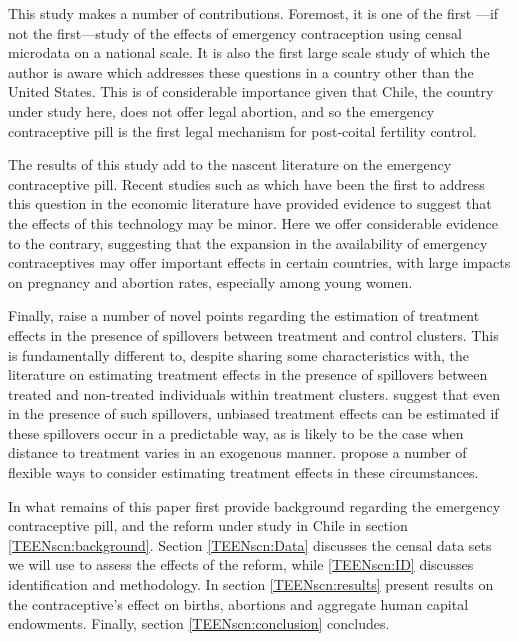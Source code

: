 This study makes a number of contributions.  Foremost, it is one of the first%
---if not the first---study of the effects of emergency contraception using 
censal microdata on a national scale.  It is also the first large scale study 
of which the author is aware which addresses these questions in a country other 
than the United States.  This is of considerable importance given that Chile, 
the country under study here, does not offer legal abortion, and so the 
emergency contraceptive pill is the first legal mechanism for post-coital 
fertility control.

The results of this study add to the nascent literature on the emergency 
contraceptive pill.  Recent studies such as \citet{Grossetal2012, Durrance2013} 
which have been the first to address this question in the economic literature
have provided evidence to suggest that the effects of this technology may be 
minor.  Here we offer considerable evidence to the contrary, suggesting
that the expansion in the availability of emergency contraceptives may offer 
important effects in certain countries, with large impacts on pregnancy and 
abortion rates, especially among young women.

Finally, \person raise a number of novel points regarding the estimation of 
treatment effects in the presence of spillovers between treatment and control
clusters.  This is fundamentally different to, despite sharing some 
characteristics with, the literature on estimating treatment effects in the 
presence of spillovers between treated and non-treated individuals within 
treatment clusters.  \Person suggest that even in the presence of such 
spillovers, unbiased treatment effects can be estimated if these spillovers
occur in a predictable way, as is likely to be the case when distance to 
treatment varies in an exogenous manner. \Person propose a number of flexible
ways to consider estimating treatment effects in these circumstances.

In what remains of this paper \person first provide background regarding the
emergency contraceptive pill, and the reform under study in Chile in section
\ref{TEENscn:background}.  Section \ref{TEENscn:Data} discusses the censal data 
sets we will use to assess the effects of the reform, while \ref{TEENscn:ID} 
discusses identification and methodology.  In section \ref{TEENscn:results} 
\person present results on the contraceptive's effect on births, abortions and 
aggregate human capital endowments.  Finally, section \ref{TEENscn:conclusion} 
concludes.
  
